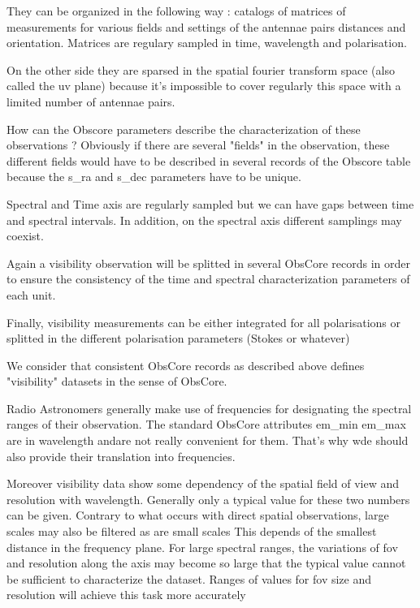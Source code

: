 \documentclass[11pt,a4paper]{ivoa}
\begin{document}
    They can be organized in the following way : catalogs of matrices of measurements for various fields and settings of the antennae pairs distances and orientation. Matrices are regulary sampled in time, wavelength and polarisation.
    
    On the other side they are sparsed in the spatial fourier transform space (also called the uv plane) because it's impossible to cover regularly this space with a limited number of antennae pairs.
    

    How can the Obscore parameters describe the characterization of these observations ?
    Obviously if there are several "fields" in the observation, these different fields would have to be described in several records of the Obscore table because the s\_ra and s\_dec parameters have to be unique.

   Spectral and Time axis are regularly sampled but we can have gaps between time and spectral intervals. In addition, on the spectral axis different samplings may coexist.  
   
   
    Again a visibility observation will be splitted in several ObsCore records in order to ensure the consistency of the time and spectral characterization parameters of each unit.
    

    Finally, visibility measurements can be either integrated for all polarisations or splitted in the different polarisation parameters (Stokes or whatever) 

    
    We consider that  consistent ObsCore records as described above defines  "visibility" datasets in the sense of ObsCore.

    Radio Astronomers generally make use of frequencies for designating the spectral ranges of their observation. The standard ObsCore attributes em\_min em\_max  are in wavelength  andare not really convenient for them. That's why wde should also provide  their translation into frequencies. 
        
    Moreover visibility data show some dependency of the spatial field of view and resolution with wavelength. Generally only a typical value for these two numbers can be given. 
    Contrary to what occurs with direct spatial observations, large scales may also be filtered as are small scales This depends of the smallest distance in the frequency plane.
    For large spectral ranges, the variations of fov and resolution along the axis may become so large that the typical value cannot be sufficient to characterize the dataset. 
    Ranges of values for fov size and resolution will achieve this task more accurately
\end{document}
